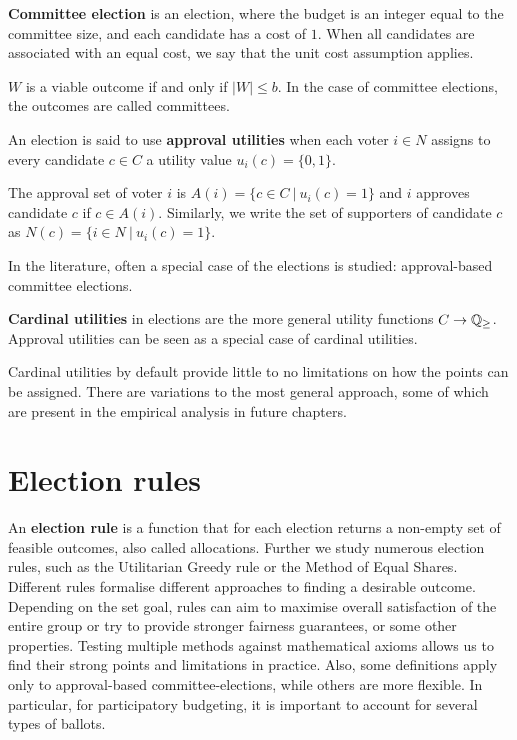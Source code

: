 \begin{definition}
\textbf{Committee election} is an election, where the budget is an integer equal to the committee size, and each candidate has a cost of $1$. When all candidates are associated with an equal cost, we say that the unit cost assumption applies.


$W$ is a viable outcome if and only if $|W|\le b$. In the case of committee elections, the outcomes are called committees.
\end{definition}
\begin{definition}
An election is said to use \textbf{approval utilities} when each voter $i\in N$ assigns to every candidate $c\in C$ a utility value $u_i(c)=\{0,1\}$.


The approval set of voter $i$ is $A(i)=\{c\in C \ | \ u_i(c)=1\}$ and $i$ approves candidate $c$ if $c\in A(i)$. Similarly, we write the set of supporters of candidate $c$ as $N(c)=\{i\in N \ | \ u_i(c)=1\}$.
\end{definition}
In the literature, often a special case of the elections is studied: approval-based committee elections.
\begin{definition}
\textbf{Cardinal utilities} in elections are the more general utility functions $C \to \mathbb{Q}_{\ge}$. Approval utilities can be seen as a special case of cardinal utilities.
\end{definition}
Cardinal utilities by default provide little to no limitations on how the points can be assigned. There are variations to the most general approach, some of which are present in the empirical analysis in future chapters.
\section{Election rules}
An \textbf{election rule} is a function that for each election returns a non-empty set of feasible outcomes, also called allocations. Further we study numerous election rules, such as the Utilitarian Greedy rule or the Method of Equal Shares\cite{EqualShares}.
Different rules formalise different approaches to finding a desirable outcome. Depending on the set goal, rules can aim to maximise overall satisfaction of the entire group or try to provide stronger fairness guarantees, or some other properties. Testing multiple methods against mathematical axioms allows us to find their strong points and limitations in practice. Also, some definitions apply only to approval-based committee-elections, while others are more flexible. In particular, for participatory budgeting, it is important to account for several types of ballots. 

